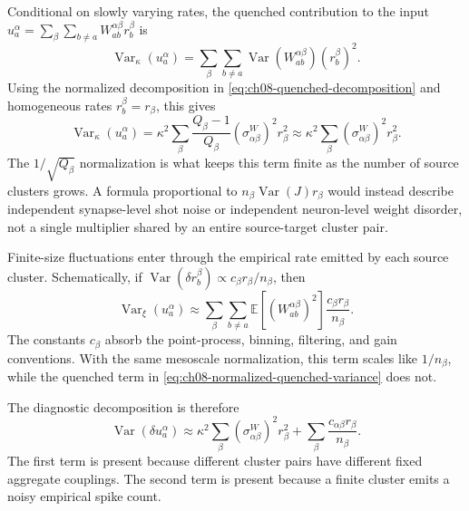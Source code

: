 Conditional on slowly varying rates, the quenched contribution to the input
\(u_a^\alpha=\sum_{\beta}\sum_{b\ne a}W_{ab}^{\alpha\beta}r_b^\beta\) is
\begin{equation}
    \operatorname{Var}_{\kappa}(u_a^\alpha)
    =
    \sum_{\beta}
    \sum_{b\ne a}
    \operatorname{Var}\!\left(W_{ab}^{\alpha\beta}\right)
    \left(r_b^\beta\right)^2 .
    \label{eq:ch08-aggregated-quenched-variance}
\end{equation}
Using the normalized decomposition in
\cref{eq:ch08-quenched-decomposition} and homogeneous rates
\(r_b^\beta=r_\beta\), this gives
\begin{equation}
    \operatorname{Var}_{\kappa}(u_a^\alpha)
    =
    \kappa^2
    \sum_{\beta}
    \frac{Q_\beta-1}{Q_\beta}
    \left(\sigma_{\alpha\beta}^{W}\right)^2
    r_\beta^2
    \approx
    \kappa^2
    \sum_{\beta}
    \left(\sigma_{\alpha\beta}^{W}\right)^2
    r_\beta^2 .
    \label{eq:ch08-normalized-quenched-variance}
\end{equation}
The \(1/\sqrt{Q_\beta}\) normalization is what keeps this term finite as the
number of source clusters grows. A formula proportional to
\(n_\beta\operatorname{Var}(J)r_\beta\) would instead describe independent
synapse-level shot noise or independent neuron-level weight disorder, not a
single multiplier shared by an entire source-target cluster pair.

Finite-size fluctuations enter through the empirical rate emitted by each
source cluster. Schematically, if
\(\operatorname{Var}(\delta r_b^\beta)\propto c_\beta r_\beta/n_\beta\), then
\begin{equation}
    \operatorname{Var}_{\xi}(u_a^\alpha)
    \approx
    \sum_{\beta}
    \sum_{b\ne a}
    \mathbb{E}\!\left[
      \left(W_{ab}^{\alpha\beta}\right)^2
    \right]
    \frac{c_\beta r_\beta}{n_\beta}.
    \label{eq:ch08-finite-size-input-variance}
\end{equation}
The constants \(c_\beta\) absorb the point-process, binning, filtering, and
gain conventions. With the same mesoscale normalization, this term scales like
\(1/n_\beta\), while the quenched term in
\cref{eq:ch08-normalized-quenched-variance} does not.

The diagnostic decomposition is therefore
\begin{equation}
    \operatorname{Var}(\delta u_a^\alpha)
    \approx
    \kappa^2
    \sum_{\beta}
    \left(\sigma_{\alpha\beta}^{W}\right)^2r_\beta^2
    +
    \sum_{\beta}
    \frac{c_{\alpha\beta}r_\beta}{n_\beta}.
    \label{eq:ch08-variance-decomposition}
\end{equation}
The first term is present because different cluster pairs have different fixed
aggregate couplings. The second term is present because a finite cluster emits
a noisy empirical spike count.


